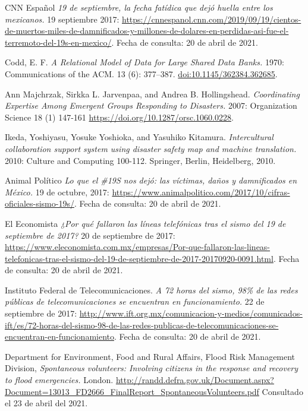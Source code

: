 \documentclass[12pt,spanish,oneside,breaklinks]{book}
\begin{document}
\begin{thebibliography}{1}



 CNN Español {\em 19 de septiembre, la fecha fatídica que dejó huella entre los mexicanos.} 19 septiembre 2017: \url{https://cnnespanol.cnn.com/2019/09/19/cientos-de-muertos-miles-de-damnificados-y-millones-de-dolares-en-perdidas-asi-fue-el-terremoto-del-19s-en-mexico/}. Fecha de consulta: 20 de abril de 2021.

 Codd, E. F. {\em A Relational Model of Data for Large Shared Data Banks.} 1970:  Communications of the ACM. 13 (6): 377–387. \url{doi:10.1145/362384.362685}.

 Ann Majchrzak, Sirkka L. Jarvenpaa, and Andrea B. Hollingshead. {\em Coordinating Expertise Among Emergent Groups
Responding to Disasters.} 2007: Organization Science 18 (1) 147-161 \url{https://doi.org/10.1287/orsc.1060.0228}.

 Ikeda, Yoshiyasu, Yosuke Yoshioka, and Yasuhiko Kitamura. {\em Intercultural collaboration support system using disaster safety map and machine translation.} 2010: Culture and Computing 100-112. Springer, Berlin, Heidelberg, 2010.

 Animal Político {\em Lo que el \#19S nos dejó: las víctimas, daños y damnificados en México.} 19 de octubre, 2017:
\url{https://www.animalpolitico.com/2017/10/cifras-oficiales-sismo-19s/}. Fecha de consulta: 20 de abril de 2021.

 El Economista {\em ¿Por qué fallaron las líneas telefónicas tras el sismo del 19 de septiembre de 2017?} 20 de septiembre de 2017: \url{https://www.eleconomista.com.mx/empresas/Por-que-fallaron-las-lineas-telefonicas-tras-el-sismo-del-19-de-septiembre-de-2017-20170920-0091.html}. Fecha de consulta: 20 de abril de 2021.

 Instituto Federal de Telecomunicaciones. {\em A 72 horas del sismo, 98\% de las redes públicas de telecomunicaciones se encuentran en funcionamiento.} 22 de septiembre de 2017:
\url{http://www.ift.org.mx/comunicacion-y-medios/comunicados-ift/es/72-horas-del-sismo-98-de-las-redes-publicas-de-telecomunicaciones-se-encuentran-en-funcionamiento}. Fecha de consulta: 20 de abril de 2021.

 Department for Environment, Food and Rural Affairs, Flood Risk Management Division, {\em Spontaneous volunteers: Involving citizens in the response and recovery to flood emergencies.} London. \url{http://randd.defra.gov.uk/Document.aspx?Document=13013_FD2666_FinalReport_SpontaneousVolunteers.pdf} Consultado el 23 de abril del 2021.


\end{thebibliography}
\end{document}
